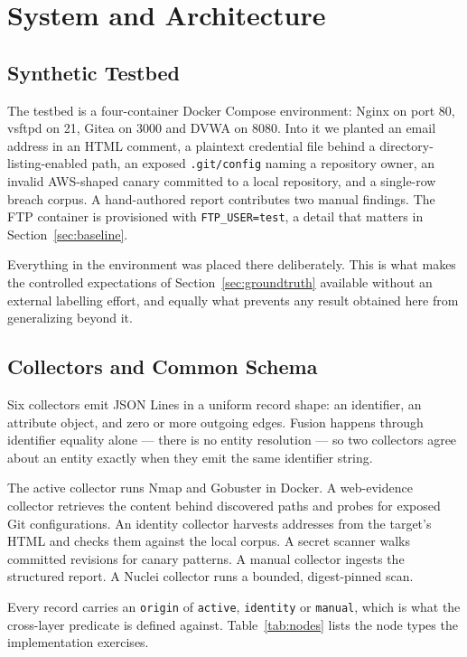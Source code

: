 \documentclass[11pt,a4paper]{article}
\begin{document}
\section{System and Architecture}
\subsection{Synthetic Testbed}
The testbed is a four-container Docker Compose environment: Nginx on port 80, vsftpd on 21, Gitea on 3000 and DVWA on 8080. Into it we planted an email address in an HTML comment, a plaintext credential file behind a directory-listing-enabled path, an exposed \texttt{.git/config} naming a repository owner, an invalid AWS-shaped canary committed to a local repository, and a single-row breach corpus. A hand-authored report contributes two manual findings. The FTP container is provisioned with \texttt{FTP\_USER=test}, a detail that matters in Section~\ref{sec:baseline}.

Everything in the environment was placed there deliberately. This is what makes the controlled expectations of Section~\ref{sec:groundtruth} available without an external labelling effort, and equally what prevents any result obtained here from generalizing beyond it.

\subsection{Collectors and Common Schema}
Six collectors emit JSON Lines in a uniform record shape: an identifier, an attribute object, and zero or more outgoing edges. Fusion happens through identifier equality alone --- there is no entity resolution --- so two collectors agree about an entity exactly when they emit the same identifier string.

The active collector runs Nmap and Gobuster in Docker. A web-evidence collector retrieves the content behind discovered paths and probes for exposed Git configurations. An identity collector harvests addresses from the target's HTML and checks them against the local corpus. A secret scanner walks committed revisions for canary patterns. A manual collector ingests the structured report. A Nuclei collector runs a bounded, digest-pinned scan.

Every record carries an \texttt{origin} of \texttt{active}, \texttt{identity} or \texttt{manual}, which is what the cross-layer predicate is defined against. Table~\ref{tab:nodes} lists the node types the implementation exercises.
\end{document}
